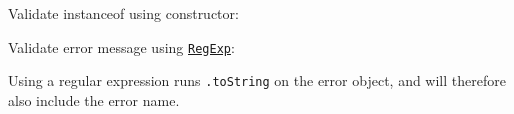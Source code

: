 Validate instanceof using constructor:

\begin{Shaded}
\begin{Highlighting}[]
 \OperatorTok{;}

\NormalTok{(}
\NormalTok{  () }\KeywordTok{=\textgreater{}}\NormalTok{ \{}
      \NormalTok{(}\NormalTok{)}\OperatorTok{;}
\NormalTok{  \}}\OperatorTok{,}
  \OperatorTok{,}
\NormalTok{)}\OperatorTok{;}
\end{Highlighting}
\end{Shaded}

\begin{Shaded}
\begin{Highlighting}[]
\OperatorTok{=} \NormalTok{(}\NormalTok{)}\OperatorTok{;}

\NormalTok{(}
\NormalTok{  () }\KeywordTok{=\textgreater{}}\NormalTok{ \{}
      \NormalTok{(}\NormalTok{)}\OperatorTok{;}
\NormalTok{  \}}\OperatorTok{,}
  \OperatorTok{,}
\NormalTok{)}\OperatorTok{;}
\end{Highlighting}
\end{Shaded}

Validate error message using
\href{https://developer.mozilla.org/en-US/docs/Web/JavaScript/Guide/Regular_Expressions}{\texttt{RegExp}}:

Using a regular expression runs \texttt{.toString} on the error object,
and will therefore also include the error name.

\begin{Shaded}
\begin{Highlighting}[]
 \OperatorTok{;}

\NormalTok{(}
\NormalTok{  () }\KeywordTok{=\textgreater{}}\NormalTok{ \{}
      \NormalTok{(}\NormalTok{)}\OperatorTok{;}
\NormalTok{  \}}\OperatorTok{,}
  \SpecialStringTok{/}\SpecialCharTok{\^{}}\SpecialCharTok{$}\SpecialStringTok{/}\OperatorTok{,}
\NormalTok{)}\OperatorTok{;}
\end{Highlighting}
\end{Shaded}


